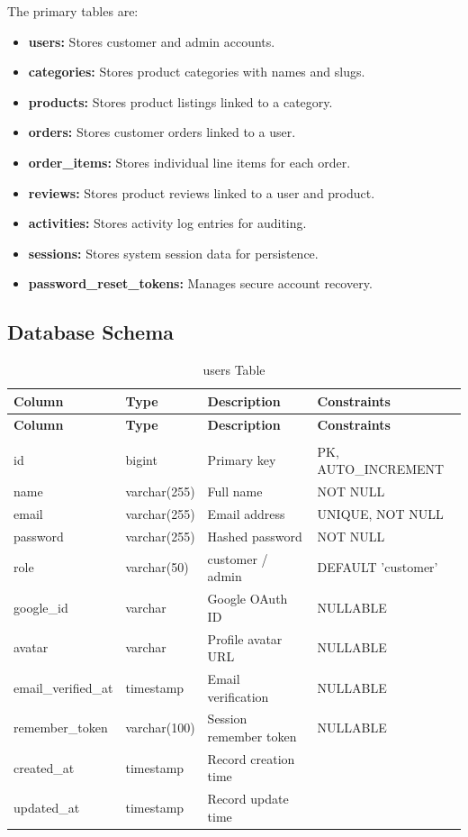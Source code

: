 The primary tables are:
\begin{itemize}
    \item \textbf{users:} Stores customer and admin accounts.
    \item \textbf{categories:} Stores product categories with names and slugs.
    \item \textbf{products:} Stores product listings linked to a category.
    \item \textbf{orders:} Stores customer orders linked to a user.
    \item \textbf{order\_items:} Stores individual line items for each order.
    \item \textbf{reviews:} Stores product reviews linked to a user and product.
    \item \textbf{activities:} Stores activity log entries for auditing.
    \item \textbf{sessions:} Stores system session data for persistence.
    \item \textbf{password\_reset\_tokens:} Manages secure account recovery.
\end{itemize}

\subsection{Database Schema}
\renewcommand{\arraystretch}{1.3}
\begin{longtable}{|p{3cm}|p{3cm}|p{4cm}|p{3cm}|}
    \hline
    \textbf{Column} & \textbf{Type} & \textbf{Description} & \textbf{Constraints} \\
    \hline
    \endfirsthead
    \hline
    \textbf{Column} & \textbf{Type} & \textbf{Description} & \textbf{Constraints} \\
    \hline
    \endhead
    \hline
    \endfoot
    \hline
    \caption{users Table} \label{tab:users} \\
    \endlastfoot
    id & bigint & Primary key & PK, AUTO\_INCREMENT \\
    \hline
    name & varchar(255) & Full name & NOT NULL \\
    \hline
    email & varchar(255) & Email address & UNIQUE, NOT NULL \\
    \hline
    password & varchar(255) & Hashed password & NOT NULL \\
    \hline
    role & varchar(50) & customer / admin & DEFAULT 'customer' \\
    \hline
    google\_id & varchar & Google OAuth ID & NULLABLE \\
    \hline
    avatar & varchar & Profile avatar URL & NULLABLE \\
    \hline
    email\_verified\_at & timestamp & Email verification & NULLABLE \\
    \hline
    remember\_token & varchar(100) & Session remember token & NULLABLE \\
    \hline
    created\_at & timestamp & Record creation time & \\
    \hline
    updated\_at & timestamp & Record update time & \\
    \hline
\end{longtable}

